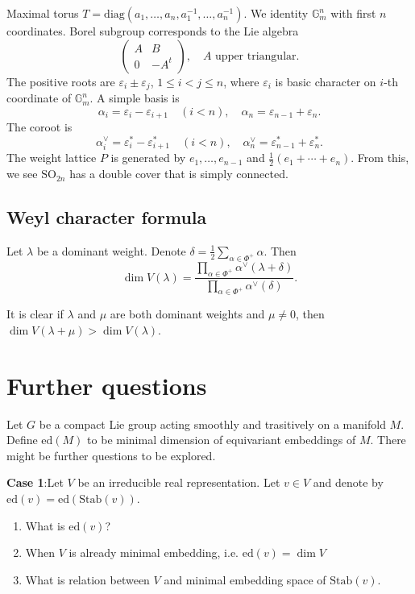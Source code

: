 \documentclass[a4paper]{amsart}
\newcommand{\BG}{{\mathbb {G}}} \newcommand{\BH}{{\mathbb {H}}}
\newcommand{\diag}{{\mathrm{diag}}}
\newcommand{\ed}{\mathrm{ed}}
\newcommand{\SO}{{\mathrm{SO}}}\newcommand{\so}{\mathfrak{so}}
\newcommand{\Stab}{{\mathrm{Stab}}}\newcommand{\Symb}{{\mathrm{Symb}}}\newcommand{\MS}{{\mathrm{MS}}}
\theoremstyle{plain}
\theoremstyle{remark} \newtheorem{remark}[thm]{Remark}
\theoremstyle{remark} \newtheorem{exercise}{Exercise}
\theoremstyle{remark} \newtheorem{example}{Example}
\numberwithin{equation}{section}
\begin{document}
Maximal torus $T=\diag(a_1,\ldots,a_n,a_1^{-1},\ldots,a_n^{-1})$. We identity $\BG_m^n$ with first $n$ coordinates. Borel subgroup corresponds to the Lie algebra
\[\begin{pmatrix}A&B\\0&-A^t\end{pmatrix},\quad A\text{ upper triangular}.\]
The positive roots are $\varepsilon_i\pm\varepsilon_j$, $1\leqslant i<j\leqslant n$, where $\varepsilon_i$ is basic character on $i$-th coordinate of $\BG_m^n$. A simple basis is
\[\alpha_i=\varepsilon_i-\varepsilon_{i+1}\quad(i<n),\quad\alpha_n=\varepsilon_{n-1}+\varepsilon_n.\]
The coroot is
\[\alpha_i^\vee=\varepsilon_i^*-\varepsilon_{i+1}^*\quad (i<n),\quad\alpha_n^\vee=\varepsilon^*_{n-1}+\varepsilon^*_n.\]
The weight lattice $P$ is generated by $e_1,\ldots,e_{n-1}$ and $\frac{1}{2}(e_1+\cdots+e_n)$. From this, we see $\SO_{2n}$ has a double cover that is simply connected.

\subsection{Weyl character formula}

Let $\lambda$ be a dominant weight. Denote $\delta=\frac{1}{2}\sum_{\alpha\in\Phi^+}\alpha$. Then 
\[\dim V(\lambda)=\frac{\prod_{\alpha\in\Phi^+}\alpha^\vee(\lambda+\delta)}{\prod_{\alpha\in\Phi^+}\alpha^\vee(\delta)}.\]

It is clear if $\lambda$ and $\mu$ are both dominant weights and $\mu\neq 0$, then $\dim V(\lambda+\mu)>\dim V(\lambda)$.

\section{Further questions}

Let $G$ be a compact Lie group acting smoothly and trasitively on a manifold $M$. Define $\ed(M)$ to be minimal dimension of equivariant embeddings of $M$. There might be further questions to be explored.

\textbf{Case 1}:Let $V$ be an irreducible real representation. Let $v\in V$ and denote by $\ed(v)=\ed(\Stab(v))$.

\begin{enumerate}
    \item What is $\ed(v)$?
    \item When $V$ is already minimal embedding, i.e. $\ed(v)=\dim V$
    \item What is relation between $V$ and minimal embedding space of $\Stab(v)$.
\end{enumerate}
\end{document}
